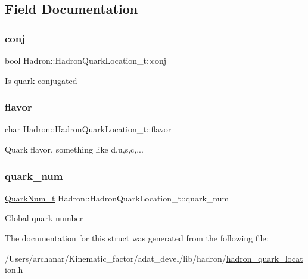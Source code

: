 \subsection{Field Documentation}
\mbox{\label{structHadron_1_1HadronQuarkLocation__t_a4fd64b1ec0731ff1017e9573768e1456}} 
\subsubsection{\texorpdfstring{conj}{conj}}
{\footnotesize\ttfamily bool Hadron\+::\+Hadron\+Quark\+Location\+\_\+t\+::conj}

Is quark conjugated \mbox{\label{structHadron_1_1HadronQuarkLocation__t_a31beaaffd8b2dec8d57b7020673e4e3d}} 
\subsubsection{\texorpdfstring{flavor}{flavor}}
{\footnotesize\ttfamily char Hadron\+::\+Hadron\+Quark\+Location\+\_\+t\+::flavor}

Quark flavor, something like d,u,s,c,... \mbox{\label{structHadron_1_1HadronQuarkLocation__t_ad4abb30a9e5f991c0eeeb4869457f8b6}} 
\subsubsection{\texorpdfstring{quark\_num}{quark\_num}}
{\footnotesize\ttfamily \mbox{\hyperlink{structHadron_1_1QuarkNum__t}{Quark\+Num\+\_\+t}} Hadron\+::\+Hadron\+Quark\+Location\+\_\+t\+::quark\+\_\+num}

Global quark number 

The documentation for this struct was generated from the following file\+:\begin{DoxyCompactItemize}
\item 
/\+Users/archanar/\+Kinematic\+\_\+factor/adat\+\_\+devel/lib/hadron/\mbox{\hyperlink{lib_2hadron_2hadron__quark__location_8h}{hadron\+\_\+quark\+\_\+location.\+h}}\end{DoxyCompactItemize}

